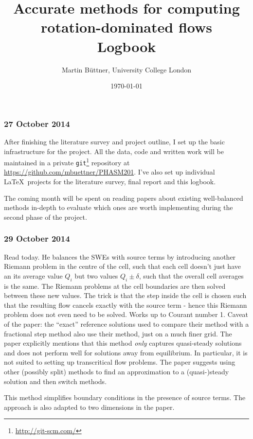 \documentclass[a4paper,onecolumn,11pt]{report}
\title{Accurate methods for computing rotation-dominated flows\\\small Logbook}
\author{Martin Büttner, University College London}
\date{\today}
\begin{document}
\maketitle

\subsubsection*{27 October 2014}

After finishing the literature survey and project outline, I set up the basic infrastructure for the project. All the data, code and written work will be maintained in a private \texttt{git}\footnote{\url{http://git-scm.com/}} repository at \url{https://github.com/mbuettner/PHASM201}. I've also set up individual \LaTeX\ projects for the literature survey, final report and this logbook.

The coming month will be spent on reading papers about existing well-balanced methods in-depth to evaluate which ones are worth implementing during the second phase of the project.

\subsubsection*{29 October 2014}

Read \citet{leveque1998balancing} today. He balances the SWEs with source terms by introducing another Riemann problem in the centre of the cell, such that each cell doesn't just have an its average value $Q_i$ but two values $Q_i \pm \delta$, such that the overall cell averages is the same. The Riemann problems at the cell boundaries are then solved between these new values. The trick is that the step inside the cell is chosen such that the resulting flow cancels exactly with the source term - hence this Riemann problem does not even need to be solved. Works up to Courant number 1. Caveat of the paper: the ``exact'' reference solutions used to compare their method with a fractional step method also use their method, just on a much finer grid. The paper explicitly mentions that this method \emph{only} captures quasi-steady solutions and does not perform well for solutions away from equilibrium. In particular, it is not suited to setting up transcritical flow problems. The paper suggests using other (possibly split) methods to find an approximation to a (quasi-)steady solution and then switch methods.

This method simplifies boundary conditions in the presence of source terms. The approach is also adapted to two dimensions in the paper.
\end{document}
